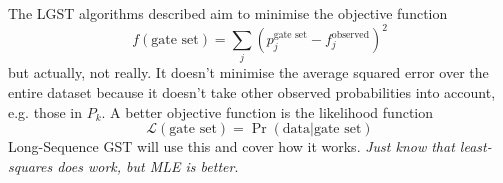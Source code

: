 \vspace{1em}

\noindent The LGST algorithms described aim to minimise the objective function
\begin{equation}
    f(\text{gate set}) = \sum_j \left(p_j^{\text{gate set}} - f_j^{\text{observed}}\right)^2
\end{equation}
but actually, not really. It doesn't minimise the average squared error over the entire dataset
because it doesn't take other observed probabilities into account, e.g. those in $P_k$. A better
objective function is the likelihood function
\begin{equation}
    \mathcal{L}(\text{gate set}) = \Pr (\text{data} | \text{gate set})
\end{equation}
Long-Sequence \ac{GST} will use this and cover how it works. \textit{Just know that least-squares
does work, but MLE is better}.